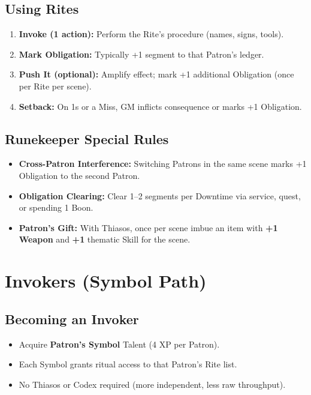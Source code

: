 \subsection{Using Rites}
\label{subsec:using-rites}
\begin{enumerate}
  \item \textbf{Invoke (1 action):} Perform the Rite's procedure (names, signs, tools).
  \item \textbf{Mark Obligation:} Typically +1 segment to that Patron's ledger.
  \item \textbf{Push It (optional):} Amplify effect; mark +1 additional Obligation (once per Rite per scene).
  \item \textbf{Setback:} On 1s or a Miss, GM inflicts consequence or marks +1 Obligation.
\end{enumerate}

\subsection{Runekeeper Special Rules}
\label{subsec:runekeeper-rules}
\begin{itemize}
  \item \textbf{Cross-Patron Interference:} Switching Patrons in the same scene marks +1 Obligation to the second Patron.
  \item \textbf{Obligation Clearing:} Clear 1--2 segments per Downtime via service, quest, or spending 1 Boon. 
  \item \textbf{Patron's Gift:} With Thiasos, once per scene imbue an item with \textbf{+1 Weapon} and \textbf{+1} thematic Skill for the scene.
\end{itemize}

\section{Invokers (Symbol Path)}
\label{sec:invokers-section}

\subsection{Becoming an Invoker}
\label{subsec:becoming-invoker}
\begin{itemize}
  \item Acquire \textbf{Patron's Symbol} Talent (4 XP per Patron). 
  \item Each Symbol grants ritual access to that Patron's Rite list.
  \item No Thiasos or Codex required (more independent, less raw throughput).
\end{itemize}

